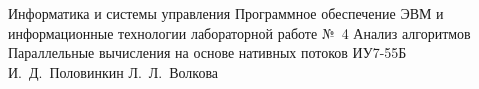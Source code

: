 \makereporttitle
{Информатика и системы управления} %
{Программное обеспечение ЭВМ и информационные технологии} %
{лабораторной работе №~4} %
{Анализ алгоритмов} %
{Параллельные вычисления на основе нативных потоков} %
{}
{ИУ7-55Б}
{И.~Д.~Половинкин} %
{Л.~Л.~Волкова}
